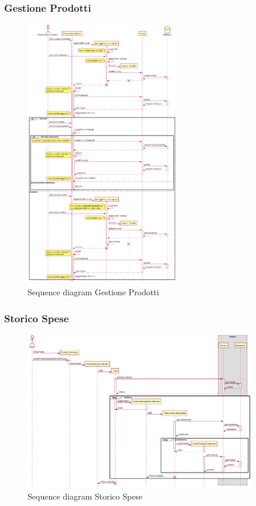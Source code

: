 \documentclass[12pt, a4paper]{report}
\begin{document}
\newpage

\subsubsection{Gestione Prodotti}

\begin{figure}[h]
  \centering
  \includegraphics[width=0.6\textwidth]{sequence_gestione_prodotto.png}
  \caption{Sequence diagram Gestione Prodotti}
\end{figure}

\newpage

\subsubsection{Storico Spese}

\begin{figure}[ht]
  \centering
  \includegraphics[width=0.9\textwidth]{shopping_history_sequence.png}
  \caption{Sequence diagram Storico Spese}
\end{figure}
\end{document}
